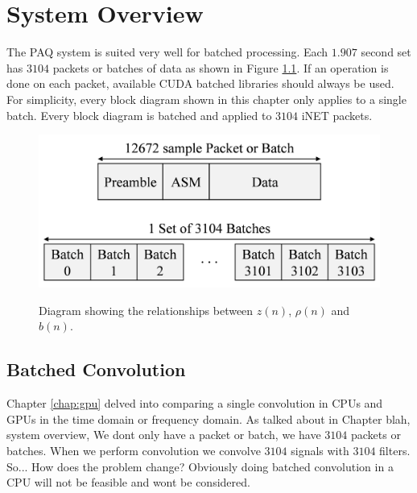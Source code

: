 

\chapter{System Overview}
\label{sec:systemOverview}




The PAQ system is suited very well for batched processing.
Each $1.907$ second set has $3104$ packets or batches of data as shown in Figure \ref{fig:packet_batch_set}.
If an operation is done on each packet, available CUDA batched libraries should always be used.
For simplicity, every block diagram shown in this chapter only applies to a single batch.
Every block diagram is batched and applied to $3104$ iNET packets.
\begin{figure}
	\caption{Diagram showing the relationships between $z(n)$, $\rho(n)$ and $b(n)$.}
	\centering\includegraphics[width=5.94in/100*55]{figures/eq_GPUimplementation/packet_batch_set.pdf}
	\label{fig:packet_batch_set}
\end{figure}


\section{Batched Convolution}
Chapter \ref{chap:gpu} delved into comparing a single convolution in CPUs and GPUs in the time domain or frequency domain.
As talked about in Chapter blah, system overview, We dont only have a packet or batch, we have $3104$ packets or batches.
When we perform convolution we convolve $3104$ signals with $3104$ filters.
So...
How does the problem change?
Obviously doing batched convolution in a CPU will not be feasible and wont be considered.

